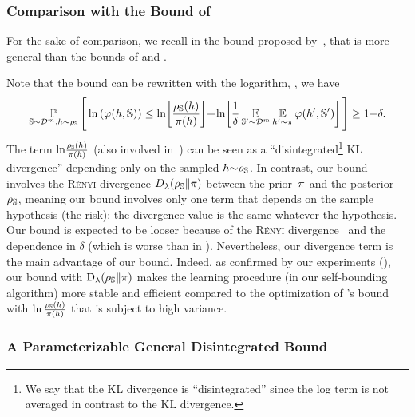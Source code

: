 \subsubsection{Comparison with the Bound of~\citet{RivasplataKuzborskijSzepesvariShaweTaylor2020}}

For the sake of comparison, we recall in  the bound proposed by~\citet[Th.1{\it (i)}]{RivasplataKuzborskijSzepesvariShaweTaylor2020}, that is more general than the bounds of \citet{BlanchardFleuret2007} and \citet[Th.1.2.7]{Catoni2007}. 

\generaldisintegratedrivasplata*

Note that the bound can be rewritten with the logarithm, \ie, we have
\begin{align*}
\PP_{\S\sim\D^\m, \h\sim\AQ}\Bigg[ \ln\LP\varphi(\h,\S)\RP \le \ln\!\LB\frac{\AQ(\h)}{\P(\h)}\RB\!+\!\ln\!\LB\frac{1}{\delta}\EE_{\S'\sim\D^\m}\EE_{\h'\sim\P}
\varphi(\h',\S')\RB
\Bigg] \ge 1{-}\delta.    
\end{align*}
The term $\ln\!\tfrac{\AQ(\h)}{\P(\h)}$ (also involved in~\citet{Catoni2007,BlanchardFleuret2007}) can be seen as a ``disintegrated\footnote{We say that the KL divergence is ``disintegrated'' since the log term is not averaged in contrast to the KL divergence.} KL divergence'' depending only on the sampled  $\h{\sim}\AQ$.
In contrast, our bound involves the \textsc{Rényi} divergence $D_\lambda(\AQ\|\P)$ between the \mbox{prior $\P$} and the posterior $\AQ$, meaning our bound involves only one term that depends on the sample hypothesis (the risk): the divergence value is the same whatever the hypothesis.
Our bound is expected to be looser because of the \textsc{Rényi} divergence~\citep[see][]{ErvenHarremoes2014} and the dependence in $\delta$ (which is worse than in ).
Nevertheless, our divergence term is the main advantage of our bound.
Indeed, as confirmed by our experiments (), our bound with $\Renyi_{\lambda}(\AQ\|\P)$ makes the learning procedure (in our self-bounding algorithm) more stable and efficient compared to the optimization of 's bound with $\ln\tfrac{\AQ(\h)}{\P(\h)}$ that is subject to high variance.
  
\subsubsection{A Parameterizable General Disintegrated  Bound}

